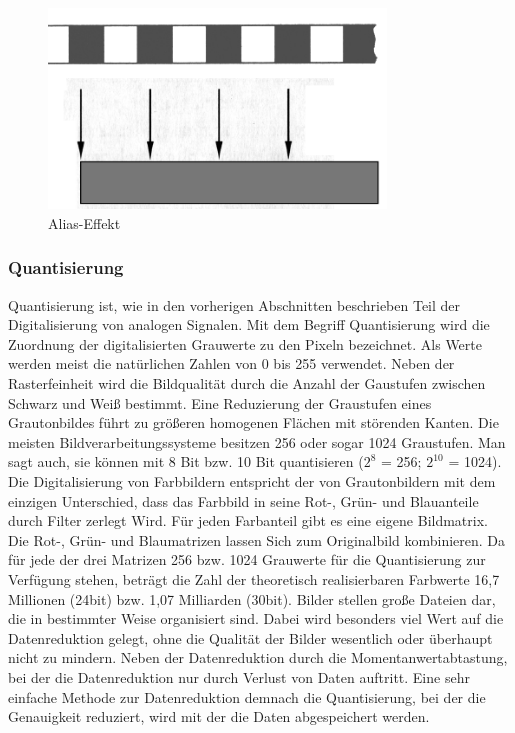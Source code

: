 \begin{figure}[h]
	\centering
		\includegraphics[width=0.8\textwidth]{img/alias_steph.png}
	\caption[Alias-Effekt]{Alias-Effekt}
	\label{fig:alias_steph}
\end{figure}

\subsubsection{Quantisierung}
Quantisierung ist, wie in den vorherigen Abschnitten beschrieben Teil der Digitalisierung von analogen Signalen. Mit dem Begriff Quantisierung wird die Zuordnung der digitalisierten Grauwerte zu den Pixeln bezeichnet. Als Werte werden meist die natürlichen Zahlen von 0 bis 255 verwendet. Neben der Rasterfeinheit wird die Bildqualität durch die Anzahl der Gaustufen zwischen Schwarz und Weiß bestimmt. Eine Reduzierung der Graustufen eines Grautonbildes führt zu größeren homogenen Flächen mit störenden Kanten. Die meisten Bildverarbeitungssysteme besitzen 256 oder sogar 1024 Graustufen. Man sagt auch, sie können mit 8 Bit bzw. 10 Bit quantisieren (${2}^8$ = 256; ${2}^{10}$ = 1024). Die Digitalisierung von Farbbildern entspricht der von Grautonbildern mit dem einzigen Unterschied, dass das Farbbild in seine Rot-, Grün- und Blauanteile durch Filter zerlegt Wird. Für jeden Farbanteil gibt es eine eigene Bildmatrix. Die Rot-, Grün- und Blaumatrizen lassen Sich zum Originalbild kombinieren. Da für jede der drei Matrizen 256 bzw. 1024 Grauwerte für die Quantisierung zur Verfügung stehen, beträgt die Zahl der theoretisch realisierbaren Farbwerte 16,7 Millionen (24bit) bzw. 1,07 Milliarden (30bit). Bilder stellen große Dateien dar, die in bestimmter Weise organisiert sind. Dabei wird besonders viel Wert auf die Datenreduktion gelegt, ohne die Qualität der Bilder wesentlich oder überhaupt nicht zu mindern. Neben der Datenreduktion durch die Momentanwertabtastung, bei der die Datenreduktion nur durch Verlust von Daten auftritt. Eine sehr einfache Methode zur Datenreduktion demnach die Quantisierung, bei der die Genauigkeit reduziert, wird mit der die Daten abgespeichert werden.



